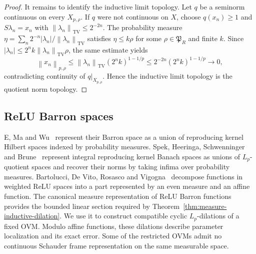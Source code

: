 \documentclass[11pt,leqno]{amsart}
\theoremstyle{compact}
\numberwithin{equation}{section}
\theoremstyle{compactremark}
\theoremstyle{compact}
\newcommand{\1}{\mathbbm{1}}
\newcommand{\norm}[1]{\left\|#1\right\|}
\newcommand{\abs}[1]{\left|#1\right|}
\begin{document}
\begin{proof}
It remains to identify the inductive limit topology. Let $q$ be a seminorm continuous on every $X_{p,\rho}$. If $q$ were not continuous on $X$, choose $q(x_n)\geq1$ and $S\lambda_n=x_n$ with $\norm{\lambda_n}_{\mathrm{TV}}\leq2^{-2n}$. The probability measure $\eta=\sum_n2^{-n}\abs{\lambda_n}/\norm{\lambda_n}_{\mathrm{TV}}$ satisfies $\eta\leq k\rho$ for some $\rho\in\mathfrak P_R$ and finite $k$. Since $\abs{\lambda_n}\leq2^nk\norm{\lambda_n}_{\mathrm{TV}}\rho$, the same estimate yields
\[
\norm{x_n}_{p,\rho}\leq\norm{\lambda_n}_{\mathrm{TV}}(2^nk)^{1-1/p}\leq2^{-2n}(2^nk)^{1-1/p}\longrightarrow0,
\]
contradicting continuity of $q|_{X_{p,\rho}}$. Hence the inductive limit topology is the quotient norm topology.
\endgroup
\end{proof}

\subsection[ReLU Barron spaces]{ReLU Barron spaces}\label{sec:barron}

E, Ma and Wu~\cite[Section~2.1]{EMaWu2022} represent their Barron space as a union of reproducing kernel Hilbert spaces indexed by probability measures. Spek, Heeringa, Schwenninger and Brune~\cite[Section~3]{SpekHeeringaSchwenningerBrune2025} represent integral reproducing kernel Banach spaces as unions of $L_p$-quotient spaces and recover their norms by taking infima over probability measures. Bartolucci, De Vito, Rosasco and Vigogna~\cite{BartolucciDeVitoRosascoVigogna2023} decompose functions in weighted ReLU spaces into a part represented by an even measure and an affine function. The canonical measure representation of ReLU Barron functions provides the bounded linear section required by Theorem~\ref{thm:measure-inductive-dilation}. We use it to construct compatible cyclic $L_p$-dilations of a fixed OVM. Modulo affine functions, these dilations describe parameter localization and its exact error. Some of the restricted OVMs admit no continuous Schauder frame representation on the same measurable space.
\end{document}
